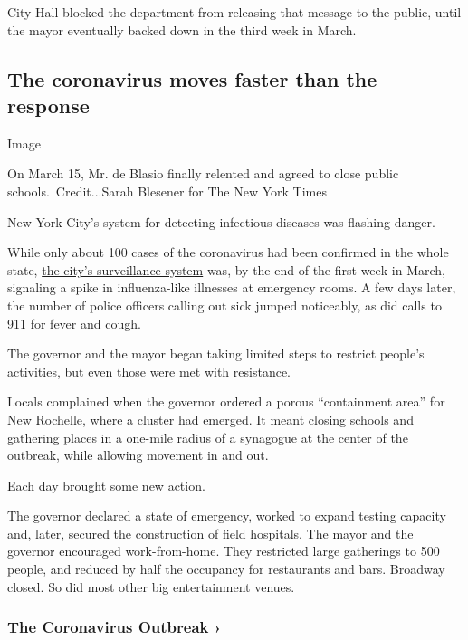 City Hall blocked the department from releasing that message to the
public, until the mayor eventually backed down in the third week in
March.

\hypertarget{the-coronavirus-moves-faster-than-the-response}{%
\subsection{The coronavirus moves faster than the
response}\label{the-coronavirus-moves-faster-than-the-response}}

Image

On March 15, Mr. de Blasio finally relented and agreed to close public
schools.~Credit...Sarah Blesener for The New York Times

New York City's system for detecting infectious diseases was flashing
danger.

While only about 100 cases of the coronavirus had been confirmed in the
whole state,
\href{https://a816-health.nyc.gov/hdi/epiquery/disease-reporting}{the
city's surveillance system} was, by the end of the first week in March,
signaling a spike in influenza-like illnesses at emergency rooms. A few
days later, the number of police officers calling out sick jumped
noticeably, as did calls to 911 for fever and cough.

The governor and the mayor began taking limited steps to restrict
people's activities, but even those were met with resistance.

Locals complained when the governor ordered a porous ``containment
area'' for New Rochelle, where a cluster had emerged. It meant closing
schools and gathering places in a one-mile radius of a synagogue at the
center of the outbreak, while allowing movement in and out.

Each day brought some new action.

The governor declared a state of emergency, worked to expand testing
capacity and, later, secured the construction of field hospitals. The
mayor and the governor encouraged work-from-home. They restricted large
gatherings to 500 people, and reduced by half the occupancy for
restaurants and bars. Broadway closed. So did most other big
entertainment venues.

\href{https://www.nytimes.com/news-event/coronavirus?action=click\&pgtype=Article\&state=default\&region=MAIN_CONTENT_3\&context=storylines_faq}{}

\hypertarget{the-coronavirus-outbreak-}{%
\subsubsection{The Coronavirus Outbreak
›}\label{the-coronavirus-outbreak-}}

